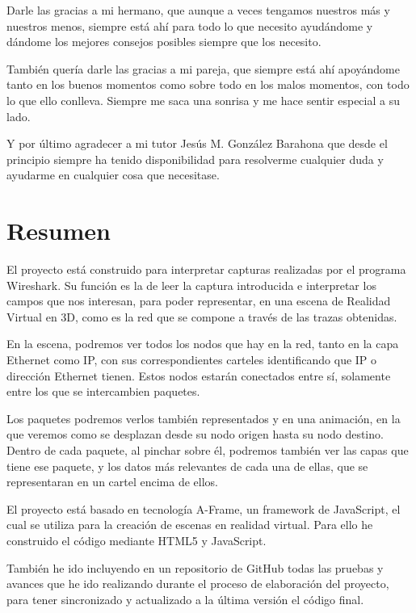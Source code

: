 \documentclass[a4paper, 12pt]{book}
\begin{document}
Darle las gracias a mi hermano, que aunque a veces tengamos nuestros más y nuestros menos, siempre está ahí para todo lo que necesito ayudándome y dándome los mejores consejos posibles siempre que los necesito.

También quería darle las gracias a mi pareja, que siempre está ahí apoyándome tanto en los buenos momentos como sobre todo en los malos momentos, con todo lo que ello conlleva. Siempre me saca una sonrisa y me hace sentir especial a su lado.

Y por último agradecer a mi tutor Jesús M. González Barahona que desde el principio siempre ha tenido disponibilidad para resolverme cualquier duda y ayudarme en cualquier cosa que necesitase.

\chapter*{Resumen}

El proyecto está construido para interpretar capturas realizadas por el programa Wireshark. Su función es la de leer la captura introducida e interpretar los campos que nos interesan, para poder representar, en una escena de Realidad Virtual en 3D, como es la red que se compone a través de las trazas obtenidas.

En la escena, podremos ver todos los nodos que hay en la red, tanto en la capa Ethernet como IP, con sus correspondientes carteles identificando que IP o dirección Ethernet tienen.
Estos nodos estarán conectados entre sí, solamente entre los que se intercambien paquetes.

Los paquetes podremos verlos también representados y en una animación, en la que veremos como se desplazan desde su nodo origen hasta su nodo destino. Dentro de cada paquete, al pinchar sobre él, podremos también ver las capas que tiene ese paquete, y los datos más relevantes de cada una de ellas, que se representaran en un cartel encima de ellos.

El proyecto está basado en tecnología A-Frame, un framework de JavaScript, el cual se utiliza para la creación de escenas en realidad virtual. Para ello he construido el código mediante HTML5 y JavaScript.

También he ido incluyendo en un repositorio de GitHub todas las pruebas y avances que he ido realizando durante el proceso de elaboración del proyecto, para tener sincronizado y actualizado a la última versión el código final.
\end{document}
